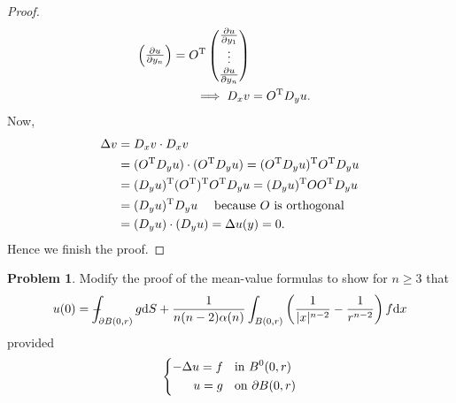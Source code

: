 \documentclass[hyperref,UTF8,12pt]{article}
\numberwithin{equation}{subsection}
\theoremstyle{plain}
\theoremstyle{definition}
\newtheorem{problem}{Problem}
\numberwithin{theorem}{section}
\numberwithin{lemma}{section}
\numberwithin{proposition}{section}
\numberwithin{remark}{section}
\numberwithin{corollary}{section}
\numberwithin{definition}{section}
\numberwithin{problem}{section}
\numberwithin{example}{section}
\def\dif{\textup{d}}
\def\T{\textup{T}}
\def\Xint#1{\mathchoice
	{\XXint\displaystyle\textstyle{#1}}%
	{\XXint\textstyle\scriptstyle{#1}}%
	{\XXint\scriptstyle\scriptscriptstyle{#1}}%
	{\XXint\scriptscriptstyle\scriptscriptstyle{#1}}%
	\!\int}
\def\XXint#1#2#3{{\setbox0=\hbox{$#1{#2#3}{\int}$ }
		\vcenter{\hbox{$#2#3$ }}\kern-.55\wd0}}
\def\dashint{\Xint-}
\newcommand{\ptl}{\partial}
\renewcommand{\geq}{\geqslant}
\begin{document}
\begin{proof}
\[\begin{aligned}
\begin{pmatrix}
		\frac{\ptl u}{\ptl y_n}
	\end{pmatrix}=O^\T\begin{pmatrix}
		\frac{\ptl u}{\ptl y_1} \\
		\vdots \\
		\frac{\ptl u}{\ptl y_n}
	\end{pmatrix}\\
	\implies D_xv &=O^\T D_yu.
\end{aligned}\]
Now,\[\begin{aligned}
	\Delta v &=D_xv\cdot D_xv\\
	&=(O^\T D_yu)\cdot(O^\T D_yu)=(O^\T D_yu)^\T O^\T D_yu \\
	&=(D_yu)^\T(O^\T)^\T O^\T D_yu=(D_yu)^\T OO^\T D_yu \\
	&=(D_yu)^\T D_yu\quad\text{ because } O \text{ is orthogonal } \\
	&=(D_yu)\cdot(D_yu)=\Delta u(y)=0.
\end{aligned}\]Hence we finish the proof.
\end{proof}
\begin{problem}
Modify the proof of the mean-value formulas to show for $n\geq3$ that
\[u(0)=\dashint_{\ptl B(0,r)}g\dif S+\frac{1}{n(n-2)\alpha(n)}\int_{B(0,r)} \left(\frac{1}{|x|^{n-2}}-\frac{1}{r^{n-2}}\right)f\dif x\]
provided\[\left\{\begin{aligned}
	-\Delta u=f &\text{\;~~in~}B^0(0,r) \\
	u=g &\text{\;~~on~}\ptl B(0,r)
\end{aligned}\right.\]
\end{problem}
\end{document}
